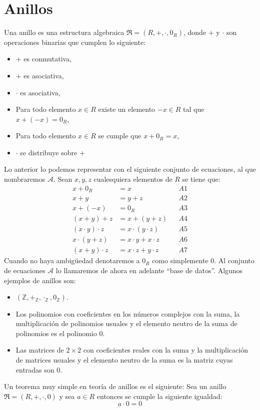 \documentclass[a4paper]{article}
\begin{document}
\section{Anillos}
\noindent
Una anillo es una estructura algebraica \(\mathfrak{R} = (R, +, \cdot, 0_{R})\),
donde \(+\) y \(\cdot\) son operaciones binarias que cumplen lo siguiente:
\begin{itemize}
    \item \(+\) es conmutativa,
    \item \(+\) es asociativa,
    \item \(\cdot\) es asociativa,
    \item Para todo elemento \(x \in R\) existe un elemento \(-x \in R\) tal que 
    \(x + (-x) = 0_{R}\),
    \item Para todo elemento \(x \in R\) se cumple que \(x + 0_{R} = x\),
    \item \(\cdot\) se distribuye sobre \(+\)
\end{itemize}
Lo anterior lo podemos representar con el siguiente conjunto de ecuaciones, al que
nombraremos \(\mathcal{A}\).
\newline 
Sean \(x, y, z\) cualesquiera elementos de \(R\) se tiene que:
\begin{align*}
    x + 0_{R} &= x & &A1 \\
    x + y &= y + z & &A2 \\
    x + (-x) &= 0_{R} & &A3 \\
    (x + y) + z &= x + (y + z) & &A4 \\
    (x \cdot y) \cdot z &= x \cdot (y \cdot z) & &A5 \\
    x \cdot (y + z) &= x \cdot y + x \cdot z & &A6 \\
    (x + y) \cdot z &= x \cdot z + y \cdot z & &A7
\end{align*}
Cuando no haya ambigüedad denotaremos a \(0_{R}\) como simplemente \(0\).
\newline
Al conjunto de ecuaciones \(\mathcal{A}\) lo llamaremos de ahora en adelante
``base de datos''.
\newline
Algunos ejemplos de anillos son:
\begin{itemize}
    \item \((\mathbb{Z}, +_{\mathbb{Z}}, \cdot_{\mathbb{Z}}, 0_{\mathbb{Z}})\).
    \item Los polinomios con coeficientes en los números complejos con la suma,
    la multiplicación de polinomios usuales y el elemento neutro de la suma de
    polinomios es el polinomio \(0\).
    \item Las matrices de \(2 \times 2\) con coeficientes reales con la suma y 
    la multiplicación de matrices usuales y el elemento neutro de la suma
    es la matriz cuyas entradas son \(0\).
\end{itemize}
Un teorema muy simple en teoría de anillos es el siguiente:
\newline
Sea un anillo \(\mathfrak{R} = (R, +, \cdot, 0)\) y sea \(a \in R\) entonces se cumple 
la siguiente igualdad:
\newline 
\[
    a \cdot 0 = 0
\]
\end{document}

